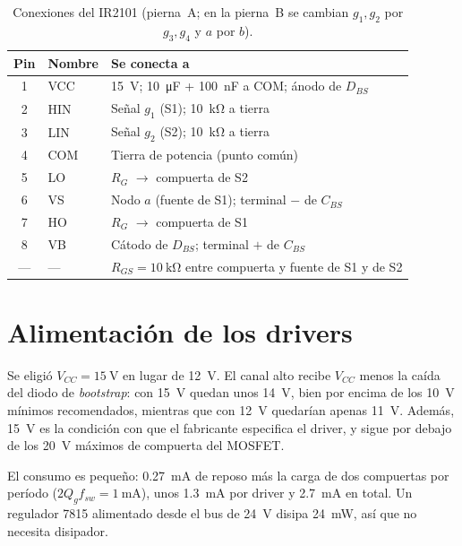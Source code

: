 \documentclass[10pt,twocolumn,letterpaper]{article}
\begin{document}
\begin{table}[!t]
\centering
\caption{Conexiones del IR2101 (pierna~A; en la pierna~B se cambian $g_1,g_2$ por $g_3,g_4$ y $a$ por $b$).}
\label{tab:pines}
\footnotesize
\begin{tabular}{@{}clL{4.6cm}@{}}
\toprule
Pin & Nombre & Se conecta a \\
 & VCC & \SI{15}{\volt}; \SI{10}{\micro\farad} + \SI{100}{\nano\farad} a COM; ánodo de $D_{BS}$ \\
2 & HIN & Señal $g_1$ (S1); \SI{10}{\kilo\ohm} a tierra \\
3 & LIN & Señal $g_2$ (S2); \SI{10}{\kilo\ohm} a tierra \\
4 & COM & Tierra de potencia (punto común) \\
5 & LO & $R_G$ $\to$ compuerta de S2 \\
6 & VS & Nodo $a$ (fuente de S1); terminal $-$ de $C_{BS}$ \\
7 & HO & $R_G$ $\to$ compuerta de S1 \\
8 & VB & Cátodo de $D_{BS}$; terminal $+$ de $C_{BS}$ \\
\midrule
--- & --- & $R_{GS}=\SI{10}{\kilo\ohm}$ entre compuerta y fuente de S1 y de S2 \\
\bottomrule
\end{tabular}
\end{table}

\section{Alimentación de los drivers}
Se eligió $V_{CC}=\SI{15}{\volt}$ en lugar de \SI{12}{\volt}. El canal alto recibe $V_{CC}$ menos la caída del diodo de \emph{bootstrap}: con \SI{15}{\volt} quedan unos \SI{14}{\volt}, bien por encima de los \SI{10}{\volt} mínimos recomendados, mientras que con \SI{12}{\volt} quedarían apenas \SI{11}{\volt}. Además, \SI{15}{\volt} es la condición con que el fabricante especifica el driver, y sigue por debajo de los \SI{20}{\volt} máximos de compuerta del MOSFET.

El consumo es pequeño: \SI{0,27}{\milli\ampere} de reposo más la carga de dos compuertas por período ($2Q_gf_{sw}=\SI{1}{\milli\ampere}$), unos \SI{1,3}{\milli\ampere} por driver y \SI{2,7}{\milli\ampere} en total. Un regulador 7815 alimentado desde el bus de \SI{24}{\volt} disipa \SI{24}{\milli\watt}, así que no necesita disipador.
\end{document}
